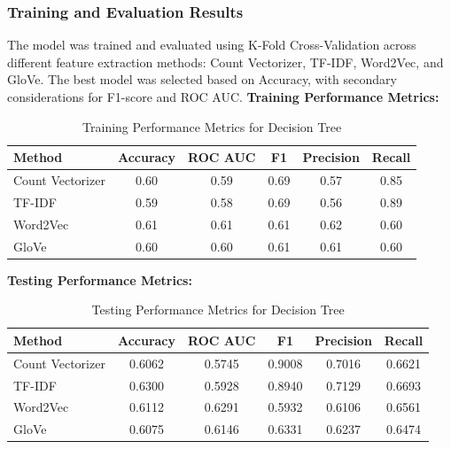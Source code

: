 \subsubsection{Training and Evaluation Results}
The model was trained and evaluated using K-Fold Cross-Validation across different feature
extraction methods: Count Vectorizer, TF-IDF, Word2Vec, and GloVe. The best model was
selected based on Accuracy, with secondary considerations for F1-score and ROC AUC.
\textbf{Training Performance Metrics:}

\begin{table}[H]
    \centering
    \caption{Training Performance Metrics for Decision Tree}
    \label{tab:lr-training-metrics}
    \begin{tabular}{|l|c|c|c|c|c|}
        \hline
        \textbf{Method} & \textbf{Accuracy} & \textbf{ROC AUC} & \textbf{F1} & \textbf{Precision} & \textbf{Recall} \\ 
        \hline
        Count Vectorizer & 0.60 & 0.59 & 0.69 & 0.57 & 0.85 \\ 
        \hline
        TF-IDF & 0.59 & 0.58 & 0.69 & 0.56 & 0.89 \\ 
        \hline
        Word2Vec & 0.61 & 0.61 & 0.61 & 0.62 & 0.60 \\ 
        \hline
        GloVe & 0.60 & 0.60 & 0.61 & 0.61 & 0.60 \\ 
        \hline
    \end{tabular}
\end{table}

\textbf{Testing Performance Metrics:}

\begin{table}[H]
    \centering
    \caption{Testing Performance Metrics for Decision Tree}
    \label{tab:lr-testing-metrics}
    \begin{tabular}{|l|c|c|c|c|c|}
        \hline
        \textbf{Method} & \textbf{Accuracy} & \textbf{ROC AUC} & \textbf{F1} & \textbf{Precision} & \textbf{Recall} \\ 
        \hline
        Count Vectorizer & 0.6062 & 0.5745 & 0.9008 & 0.7016 & 0.6621 \\ 
        \hline
        TF-IDF & 0.6300 & 0.5928 & 0.8940 & 0.7129 & 0.6693 \\ 
        \hline
        Word2Vec & 0.6112 & 0.6291 & 0.5932 & 0.6106 & 0.6561 \\ 
        \hline
        GloVe & 0.6075 & 0.6146 & 0.6331 & 0.6237 & 0.6474 \\ 
        \hline
    \end{tabular}
\end{table}

